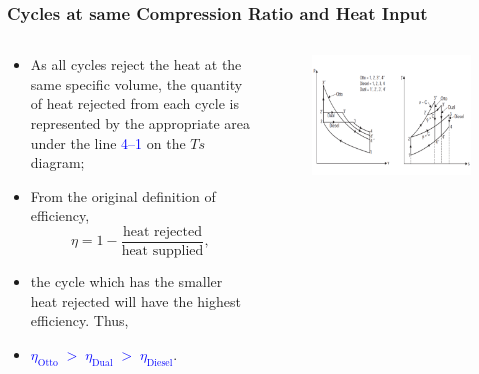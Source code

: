 \documentclass[10pt,compress]{beamer}
\newcommand{\frc}{\displaystyle\frac}
\begin{document}
\begin{frame}
 \frametitle{Cycles at same Compression Ratio and Heat Input}
  \begin{columns}
   \begin{column}[c]{0.4\linewidth}
    \begin{itemize}
     \item <1-> As all cycles reject the heat at the same specific volume, the quantity of heat rejected from each cycle is represented by the appropriate area under the line \textcolor{blue}{4--1} on the $Ts$ diagram;
     \item <2-> From the original definition of efficiency,         
       \begin{displaymath}
        \eta = 1 - \frc{\text{heat rejected}}{\text{heat supplied}},
       \end{displaymath}
    \item <3-> the cycle which has the smaller heat rejected will have the highest efficiency. Thus, 
    \item <4-> \textcolor{blue}{$\eta_{\text{Otto}} \; > \; \eta_{\text{Dual}} \; > \; \eta_{\text{Diesel}}$}.
    \end{itemize}
   \end{column}
   \begin{column}[c]{0.6\linewidth}
    \begin{figure}%
     \begin{center}
      \includegraphics[width=7.cm,clip]{./Pics/InternalCombustion_Comparison2}
     \end{center}
    \end{figure}   
   \end{column}  
  \end{columns}
\end{frame}
\end{document}
